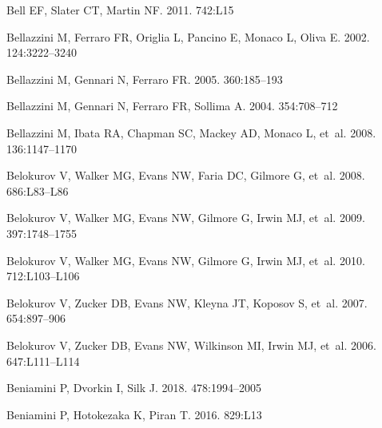\documentclass[a4paper]{ar-1col}
\begin{document}
\begin{thebibliography}{}
{Bell} EF, {Slater} CT, {Martin} NF. 2011.
\textit{\apjl} 742:L15

{Bellazzini} M, {Ferraro} FR, {Origlia} L, {Pancino} E, {Monaco} L, {Oliva} E.
  2002.
\textit{\aj} 124:3222--3240

{Bellazzini} M, {Gennari} N, {Ferraro} FR. 2005.
\textit{\mnras} 360:185--193

{Bellazzini} M, {Gennari} N, {Ferraro} FR, {Sollima} A. 2004.
\textit{\mnras} 354:708--712

{Bellazzini} M, {Ibata} RA, {Chapman} SC, {Mackey} AD, {Monaco} L, et~al. 2008.
\textit{\aj} 136:1147--1170

{Belokurov} V, {Walker} MG, {Evans} NW, {Faria} DC, {Gilmore} G, et~al. 2008.
\textit{\apjl} 686:L83--L86

{Belokurov} V, {Walker} MG, {Evans} NW, {Gilmore} G, {Irwin} MJ, et~al. 2009.
\textit{\mnras} 397:1748--1755

{Belokurov} V, {Walker} MG, {Evans} NW, {Gilmore} G, {Irwin} MJ, et~al. 2010.
\textit{\apjl} 712:L103--L106

{Belokurov} V, {Zucker} DB, {Evans} NW, {Kleyna} JT, {Koposov} S, et~al. 2007.
\textit{\apj} 654:897--906

{Belokurov} V, {Zucker} DB, {Evans} NW, {Wilkinson} MI, {Irwin} MJ, et~al.
  2006.
\textit{\apjl} 647:L111--L114

{Beniamini} P, {Dvorkin} I, {Silk} J. 2018.
\textit{\mnras} 478:1994--2005

{Beniamini} P, {Hotokezaka} K, {Piran} T. 2016{}.
\textit{\apjl} 829:L13


\end{thebibliography}
\end{document}
